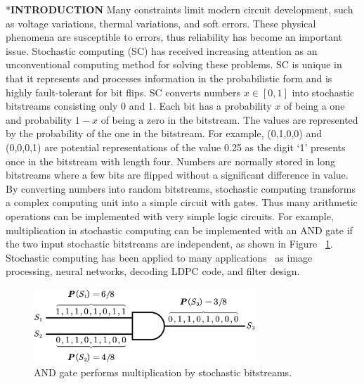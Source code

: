 \documentclass[conference,letterpaper]{IEEEtran}
\makeatletter
\renewcommand{\section}{\@startsection{section}{1}{0mm}
    {-\baselineskip}{0.001\baselineskip}{\bf\leftline}}
\makeatother
\begin{document}
\section*{\textbf{\large INTRODUCTION}}
Many constraints limit modern circuit development, such as voltage variations, thermal variations, and soft errors. These physical phenomena are susceptible to errors, thus reliability has become an important issue. Stochastic computing (SC) has received increasing attention as an unconventional computing method for solving these problems. SC is unique in that it represents and processes information in the probabilistic form and is highly fault-tolerant for bit flips. SC converts numbers $x\in[0,1]$ into stochastic bitstreams consisting only 0 and 1. 
Each bit has a probability $x$ of being a one and probability $1-x$ of being a zero in the bitstream. The values are represented by the probability of the one in the bitstream. For example, (0,1,0,0) and (0,0,0,1) are potential representations of the value 0.25 as the digit `1' presents once in the bitstream with length four. Numbers are normally stored in long bitstreams where a few bits are flipped without a significant difference in value. By converting numbers into random bitstreams, stochastic computing transforms a complex computing unit into a simple circuit with gates. Thus many arithmetic operations can be implemented with very simple logic circuits. For example, multiplication in stochastic computing can be implemented with an AND gate if the two input stochastic bitstreams are independent, as shown in Figure ~\ref{fig:sto}. 
Stochastic computing has been applied to many applications~\cite{Promise-and-Challenge} as image processing, neural networks, decoding LDPC code, and filter design.


\begin{figure}[t]
	\centering
	\includegraphics[width=3.3in]{fig/AND3.pdf}
	\caption{\label{fig:sto}AND gate performs multiplication by stochastic bitstreams.}  \vspace{-3.5ex}
\end{figure}
\end{document}
